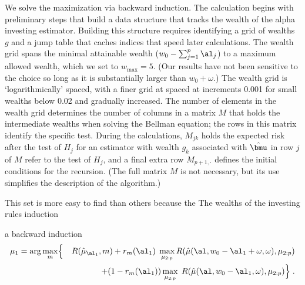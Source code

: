 \documentclass[12pt]{article}
\begin{document}
 
 We solve the maximization  via backward induction.  The
 calculation begins with preliminary steps that build a data structure that
 tracks the wealth of the alpha investing estimator.  Building this structure
 requires identifying a grid of wealths $g$ and a jump table that caches indices
 that speed later calculations.  The wealth grid spans the minimal attainable
 wealth ($w_0 - \sum_{j=1}^p \al_j$) to a maximum allowed wealth, which we set
 to $w_{\max} = 5$.  (Our results have not been sensitive to the choice so long
 as it is substantially larger than $w_0 + \omega$.)  The wealth grid is
 `logarithmically' spaced, with a finer grid at spaced at increments 0.001 for
 small wealths below 0.02 and gradually increased.  The number of elements in
 the wealth grid determines the number of columns in a matrix $M$ that holds the
 intermediate wealths when solving the Bellman equation; the rows in this matrix
 identify the specific test.  During the calculations, $M_{jk}$ holds the
expected risk after the test of $H_j$ for an estimator with wealth $g_k$
 associated with $\hat{\bmu}$ in row $j$ of $M$ refer to the test of
 $H_j$, and a final extra row $M_{p+1,\cdot}$ defines the initial conditions for
 the recursion. (The full matrix $M$ is not necessary, but its use simplifies the
 description of the algorithm.)


 This set is more easy to find than others
 because the The wealths of the investing rules induction

a backward induction \begin{eqnarray*}
    \mu_1 = \arg \max_{m} & \Bigl\{ & R(\hat\mu_{\al_1},m) \Bigr. 
        + r_{m}(\al_1) \; \max_{\mu_{2:p}} 
              R(\hat\mu(\al,w_0-\al_1+\omega,\omega),\mu_{2:p})\cr
    & & + \Bigl. (1-r_{m}(\al_1)) \max_{\mu_{2:p}} \; 
              R(\hat\mu(\al,w_0-\al_1,\omega),\mu_{2:p}) \Bigr\} \;.
 \end{eqnarray*}
\end{document}
